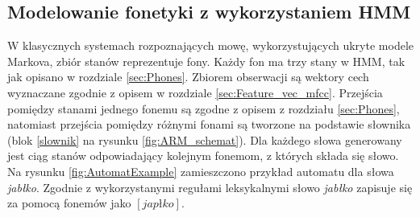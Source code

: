 \documentclass[11pt]{article}
\newcommand{\refBlock}[1]{%
	\hyperref[#1]{\ref*{#1}}%
}
\begin{document}
	
    \subsection{Modelowanie fonetyki z wykorzystaniem HMM }
    W klasycznych systemach rozpoznających mowę, wykorzystujących ukryte modele Markova, zbiór stanów reprezentuje fony. Każdy fon ma trzy stany w HMM, tak jak opisano w rozdziale \ref{sec:Phones}. Zbiorem obserwacji są wektory cech wyznaczane zgodnie z opisem w rozdziale \ref{sec:Feature_vec_mfcc}. Przejścia pomiędzy stanami jednego fonemu są zgodne z opisem z rozdziału \ref{sec:Phones}, natomiast przejścia pomiędzy różnymi fonami są tworzone na podstawie słownika (blok \refBlock{slownik} na rysunku \ref{fig:ARM_schemat}). Dla każdego słowa generowany jest ciąg stanów odpowiadający kolejnym fonemom, z których składa się słowo. \\
    Na rysunku \ref{fig:AutomatExample} zamieszczono przykład automatu dla słowa \textit{jabłko}. Zgodnie z wykorzystanymi regułami leksykalnymi słowo \textit{jabłko} zapisuje się za pomocą fonemów jako $[j a p ł k o]$. \\
    
\end{document}
